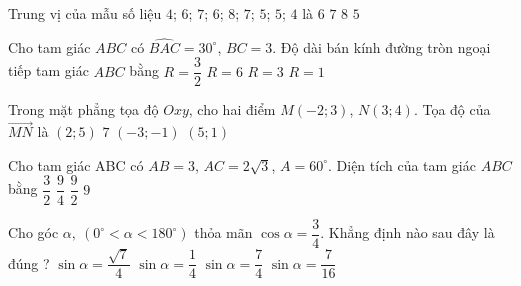 \begin{ex}%
	Trung vị của mẫu số liệu $4$; $6$; $7$; $6$; $8$; $7$; $5$; $5$; $4$ là
	\choice
	{\True $6$}
	{$7$}
	{$8$}
	{$5$}
\end{ex}
\begin{ex}%
	Cho tam giác $ABC$ có $\widehat{BAC} = 30^\circ$, $BC=3$. Độ dài bán kính đường tròn ngoại tiếp tam giác $ABC$ bằng
	\choice
	{$R=\dfrac{3}{2}$}
	{$R=6$}
	{\True $R=3$}
	{$R=1$}
\end{ex}
\begin{ex}%
	Trong mặt phẳng tọa độ $Oxy$, cho hai điểm $M(-2;3)$, $N(3; 4)$. Tọa độ của $\overrightarrow{MN}$ là
	\choice
	{$(2;5)$}
	{$7$}
	{$(-3;-1)$}
	{\True$(5;1)$}
\end{ex}
\begin{ex}%
	Cho tam giác ABC có $AB=3$, $AC= 2\sqrt{3}$, $A=60^\circ$. Diện tích của tam giác $ABC$ bằng
	\choice
	{$\dfrac{3}{2}$}
	{$\dfrac{9}{4}$}
	{\True $\dfrac{9}{2}$}
	{$9$}
\end{ex}
\begin{ex}%
	Cho góc $\alpha,~ (0^\circ <\alpha < 180^\circ)$ thỏa mãn $\cos \alpha =\dfrac{3}{4}$. Khẳng định nào sau đây là đúng ?
	\choice
	{\True $\sin\alpha=\dfrac{\sqrt{7}}{4}$}
	{$\sin\alpha=\dfrac{1}{4}$}
	{$\sin\alpha=\dfrac{7}{4}$}
	{$\sin\alpha=\dfrac{7}{16}$}
\end{ex}

